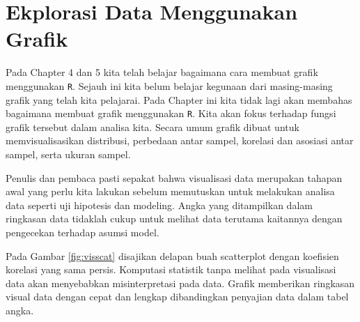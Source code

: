 \documentclass[]{book}
\begin{document}
\chapter{Ekplorasi Data Menggunakan
Grafik}\label{ekplorasi-data-menggunakan-grafik}

Pada Chapter 4 dan 5 kita telah belajar bagaimana cara membuat grafik
menggunakan \texttt{R}. Sejauh ini kita belum belajar kegunaan dari
masing-masing grafik yang telah kita pelajarai. Pada Chapter ini kita
tidak lagi akan membahas bagaimana membuat grafik menggunakan
\texttt{R}. Kita akan fokus terhadap fungsi grafik tersebut dalam
analisa kita. Secara umum grafik dibuat untuk memvisualisasikan
distribusi, perbedaan antar sampel, korelasi dan asosiasi antar sampel,
serta ukuran sampel.

Penulis dan pembaca pasti sepakat bahwa visualisasi data merupakan
tahapan awal yang perlu kita lakukan sebelum memutuskan untuk melakukan
analisa data seperti uji hipotesis dan modeling. Angka yang ditampilkan
dalam ringkasan data tidaklah cukup untuk melihat data terutama
kaitannya dengan pengecekan terhadap asumsi model.

Pada Gambar \ref{fig:visscat} disajikan delapan buah scatterplot dengan
koefisien korelasi yang sama persis. Komputasi statistik tanpa melihat
pada visualisasi data akan menyebabkan misinterpretasi pada data. Grafik
memberikan ringkasan visual data dengan cepat dan lengkap dibandingkan
penyajian data dalam tabel angka.
\end{document}
